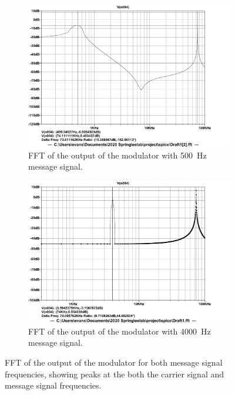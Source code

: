 \documentclass[11pt,letter,notitlepage]{article}
\begin{document}
	\begin{figure}[h]
		\centering
		\begin{subfigure}{0.9\linewidth}
			\centering
			\includegraphics[width=\linewidth,clip,trim=0 1.2em 0 1.2em]{modulator/fft500}
			\caption{FFT of the output of the modulator with \SI{500}{\Hz} message signal.}
			\label{fig:fft500}
		\end{subfigure}
	
		\vspace{1em}
		
		\begin{subfigure}{0.9\linewidth}
			\centering
			\includegraphics[width=\linewidth,clip,trim=0 1.2em 0 1.2em]{modulator/fft4k}
			\caption{FFT of the output of the modulator with \SI{4000}{\Hz} message signal.}
			\label{fig:fft4k}
		\end{subfigure}
	
		\caption{FFT of the output of the modulator for both message signal frequencies, showing peaks at the both the carrier signal and message signal frequencies.}
		\label{fig:modfft}
	\end{figure}
\end{document}
